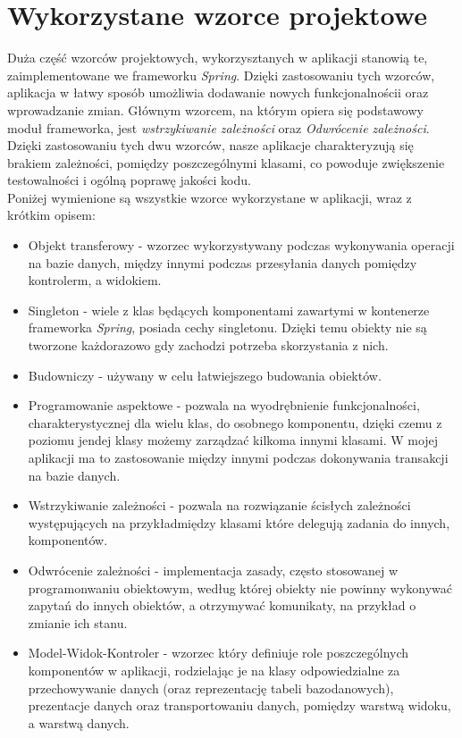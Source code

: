 \documentclass[a4paper, titlepage]{article}
\begin{document}
\section{Wykorzystane wzorce projektowe}
	Duża część wzorców projektowych, wykorzysztanych w aplikacji stanowią te, zaimplementowane we frameworku \textit{Spring}. Dzięki zastosowaniu tych wzorców, aplikacja w łatwy sposób umożliwia dodawanie nowych funkcjonalnościi oraz wprowadzanie zmian. Głównym wzorcem, na którym opiera się podstawowy moduł frameworka, jest \textit{wstrzykiwanie zależności} oraz \textit{Odwrócenie zależności}. Dzięki zastosowaniu tych dwu wzorców, nasze aplikacje charakteryzują się brakiem zależności, pomiędzy poszczególnymi klasami, co powoduje zwiększenie testowalności i ogólną poprawę jakości kodu.
	\\Poniżej wymienione są wszystkie wzorce wykorzystane w aplikacji, wraz z krótkim opisem:
	\begin{itemize}
	\item Objekt transferowy - wzorzec wykorzystywany podczas wykonywania operacji na bazie danych, między innymi podczas przesyłania danych pomiędzy kontrolerm, a widokiem.
	\item Singleton - wiele z klas będących komponentami zawartymi w kontenerze frameworka \textit{Spring}, posiada cechy singletonu. Dzięki temu obiekty nie są tworzone każdorazowo gdy zachodzi potrzeba skorzystania z nich.
	\item Budowniczy - używany w celu łatwiejszego budowania obiektów.
	\item Programowanie aspektowe - pozwala na wyodrębnienie funkcjonalności, charakterystycznej dla wielu klas, do osobnego komponentu, dzięki czemu z poziomu jendej klasy możemy zarządzać kilkoma innymi klasami. W mojej aplikacji ma to zastosowanie między innymi podczas dokonywania transakcji na bazie danych.
	\item Wstrzykiwanie zależności - pozwala na rozwiązanie ścisłych zależności występujących na przykładmiędzy klasami które delegują zadania do innych, komponentów.
 	\item Odwrócenie zależności - implementacja zasady, często stosowanej w programonwaniu obiektowym, według której obiekty nie powinny wykonywać zapytań do innych obiektów, a otrzymywać komunikaty, na przykład o zmianie ich stanu.
	\item Model-Widok-Kontroler - wzorzec który definiuje role poszczególnych komponentów w aplikacji, rodzielając je na klasy odpowiedzialne za przechowywanie danych (oraz reprezentację tabeli bazodanowych), prezentacje danych oraz transportowaniu danych, pomiędzy warstwą widoku, a warstwą danych.
	\end{itemize}	
\end{document}
